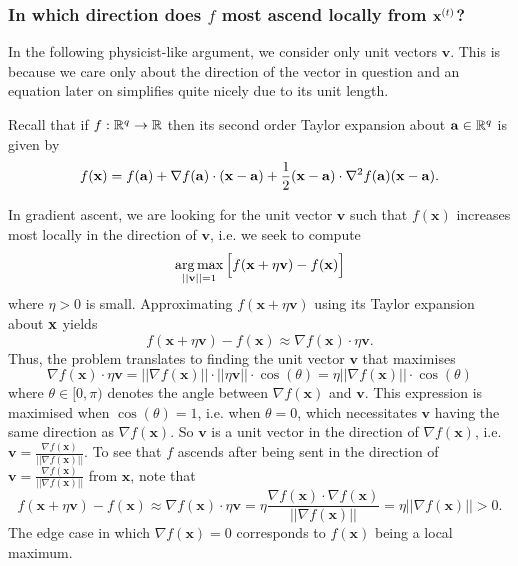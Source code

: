 \documentclass[11pt]{article}
\begin{document}
\subsubsection{In which direction does $f$ most ascend locally from $\mathbf{x}^{(t)}$?}
In the following physicist-like argument, we consider only unit vectors $\mathbf{v}$. This is because we care only about the direction of the vector in question and an equation later on simplifies quite nicely due to its unit length. 

\begin{tcolorbox}[title={\centering\textbf{Multivariate Taylor expansion}}, colback=myLightBlue, colbacktitle=myDarkBlue, colframe=myDarkBlue, coltitle=white]
    Recall that if $f:\mathbb{R}^q\to\mathbb{R}$ then its second order Taylor expansion about $\mathbf{a}\in\mathbb{R}^q$ is given by
    $$
    f(\mathbf{x})
    =
    f(\mathbf{a})+\nabla f(\mathbf{a})\cdot(\mathbf{x}-\mathbf{a})+\frac{1}{2}(\mathbf{x}-\mathbf{a})\cdot\nabla^2 f(\mathbf{a})(\mathbf{x}-\mathbf{a}).
    $$
\end{tcolorbox}

In gradient ascent, we are looking for the unit vector $\mathbf{v}$ such that $f(\mathbf{x})$ increases most locally in the direction of $\mathbf{v}$, i.e. we seek to compute
$$\operatorname*{arg\,max}_{||\mathbf{v}||=1}\Big[f(\mathbf{x}+\eta\mathbf{v})-f(\mathbf{x})\Big]$$
where $\eta>0$ is small. Approximating $f(\mathbf{x}+\eta\mathbf{v})$ using its Taylor expansion about $\mathbf{x}$ yields
$$
f(\mathbf{x}+\eta\mathbf{v})-f(\mathbf{x})
\approx
\nabla f(\mathbf{x})\cdot\eta\mathbf{v}.
$$
Thus, the problem translates to finding the unit vector $\mathbf{v}$ that maximises
$$
\nabla f(\mathbf{x})\cdot\eta\mathbf{v}=||\nabla f(\mathbf{x})||\cdot||\eta\mathbf{v}||\cdot\cos(\theta)=\eta||\nabla f(\mathbf{x})||\cdot\cos(\theta)
$$
where $\theta\in[0,\pi)$ denotes the angle between $\nabla f(\mathbf{x})$ and $\mathbf{v}$. This expression is maximised when $\cos(\theta)=1$, i.e. when $\theta=0$, which necessitates $\mathbf{v}$ having the same direction as $\nabla f(\mathbf{x})$. So $\mathbf{v}$ is a unit vector in the direction of $\nabla f(\mathbf{x})$, i.e. $\mathbf{v}=\frac{\nabla f(\mathbf{x})}{||\nabla f(\mathbf{x})||}$. To see that $f$ ascends after being sent in the direction of $\mathbf{v}=\frac{\nabla f(\mathbf{x})}{||\nabla f(\mathbf{x})||}$ from $\mathbf{x}$, note that
$$
f(\mathbf{x}+\eta\mathbf{v})-f(\mathbf{x})
\approx
\nabla f(\mathbf{x})\cdot\eta\mathbf{v}
=
\eta\frac{\nabla f(\mathbf{x})\cdot\nabla f(\mathbf{x})}{||\nabla f(\mathbf{x})||}
=
\eta||\nabla f(\mathbf{x})||
>
0.
$$
The edge case in which $\nabla f(\mathbf{x})=0$ corresponds to $f(\mathbf{x})$ being a local maximum.
\end{document}
